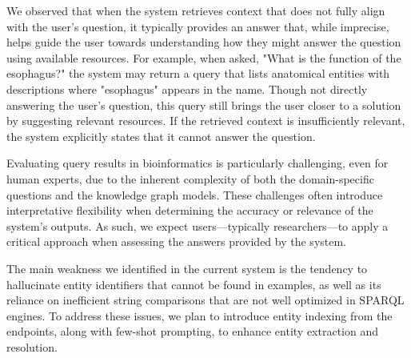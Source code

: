 \documentclass[
]{ceurart}
\begin{document}
We observed that when the system retrieves context that does not fully align with the user’s question, it typically provides an answer that, while imprecise, helps guide the user towards understanding how they might answer the question using available resources. For example, when asked, "What is the function of the esophagus?" the system may return a query that lists anatomical entities with descriptions where "esophagus" appears in the name. Though not directly answering the user’s question, this query still brings the user closer to a solution by suggesting relevant resources. If the retrieved context is insufficiently relevant, the system explicitly states that it cannot answer the question.

Evaluating query results in bioinformatics is particularly challenging, even for human experts, due to the inherent complexity of both the domain-specific questions and the knowledge graph models. These challenges often introduce interpretative flexibility when determining the accuracy or relevance of the system’s outputs. As such, we expect users—typically researchers—to apply a critical approach when assessing the answers provided by the system.

The main weakness we identified in the current system is the tendency to hallucinate entity identifiers that cannot be found in examples, as well as its reliance on inefficient string comparisons that are not well optimized in SPARQL engines. To address these issues, we plan to introduce entity indexing from the endpoints, along with few-shot prompting, to enhance entity extraction and resolution.



\end{document}
